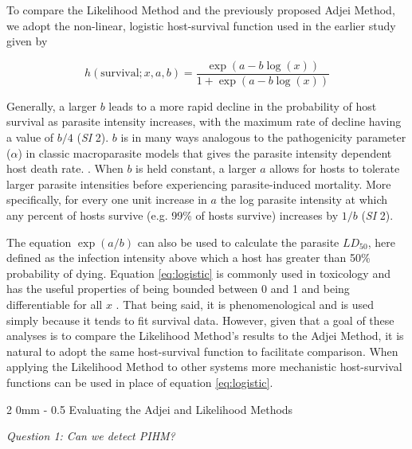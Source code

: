 \documentclass[12pt, a4paper]{article}
\makeatletter
\renewcommand{\subsection}{\@startsection
{subsection}%
{2}%
{0mm}%
{-\baselineskip}%
{0.5\baselineskip}%
{\normalfont\bf}} %
\makeatother
\begin{document}
To compare the Likelihood Method and the previously proposed Adjei Method, we adopt the non-linear, logistic host-survival function used in the earlier study given by

\begin{equation}
    h(\text{survival}; x, a, b) = \dfrac{\exp{(a - b \log(x))}}{1 + \exp{(a - b \log(x))}}
    \label{eq:logistic}
\end{equation}

Generally, a larger $b$ leads to a more rapid decline in the probability of host survival as parasite intensity increases, with the maximum rate of decline having a value of $b / 4$ (\emph{SI} 2). $b$ is in many ways analogous to the pathogenicity parameter ($\alpha$) in classic macroparasite models that gives the parasite intensity dependent host death rate. \citep{AndersonandMay1978,Isham1995}. When $b$ is held constant, a larger $a$ allows for hosts to tolerate larger parasite intensities before experiencing parasite-induced mortality. More specifically, for every one unit increase in $a$ the log parasite intensity at which any percent of hosts survive (e.g. 99\% of hosts survive) increases by $1 / b$ (\emph{SI} 2).

The equation $\exp(a
/ b)$ can also be used to calculate the parasite $LD_{50}$, here defined as the
infection intensity above which a host has greater than 50\% probability of dying.  Equation \ref{eq:logistic} is commonly used in toxicology and has the useful properties of being bounded between 0 and 1 and being differentiable for all $x$ \citep{Collet2002}.  That being said, it is phenomenological and is used simply because it tends to fit survival data. However, given that a goal of these analyses is to
compare the Likelihood Method's results to the Adjei Method, it is natural
to adopt the same host-survival function to facilitate comparison.  When
applying the Likelihood Method to other systems more mechanistic host-survival functions can be used in place of equation \ref{eq:logistic}.

\subsection{Evaluating the Adjei and Likelihood Methods}

\emph{Question 1: Can we detect PIHM?}
\end{document}
